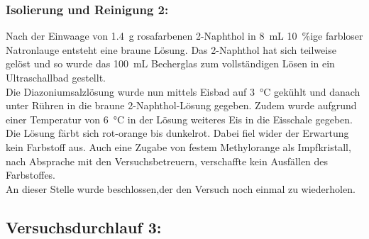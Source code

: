 \subsubsection*{Isolierung und Reinigung 2:}
Nach der Einwaage von \SI{1,4}{\gram } rosafarbenen 2-Naphthol in \SI{8}{\milli \liter} \SI{10}{\percent}ige farbloser Natronlauge entsteht eine braune Lösung. Das 2-Naphthol hat sich teilweise gelöst und so wurde das \SI{100}{\milli \liter} Becherglas zum vollständigen Lösen in ein Ultraschallbad gestellt.\\
Die Diazoniumsalzlösung wurde nun mittels Eisbad auf \SI{3}{\celsius} gekühlt und danach unter Rühren in die braune 2-Naphthol-Lösung gegeben. Zudem wurde aufgrund einer Temperatur von \SI{6}{\celsius} in der Lösung weiteres Eis in die Eisschale gegeben. Die Lösung färbt sich rot-orange bis dunkelrot. Dabei fiel wider der Erwartung kein Farbstoff aus. Auch eine Zugabe von festem Methylorange als Impfkristall, nach Absprache mit den Versuchsbetreuern,   verschaffte kein Ausfällen des Farbstoffes.\\
An dieser Stelle wurde beschlossen,der den Versuch noch einmal zu wiederholen.

\subsection{Versuchsdurchlauf 3: }
